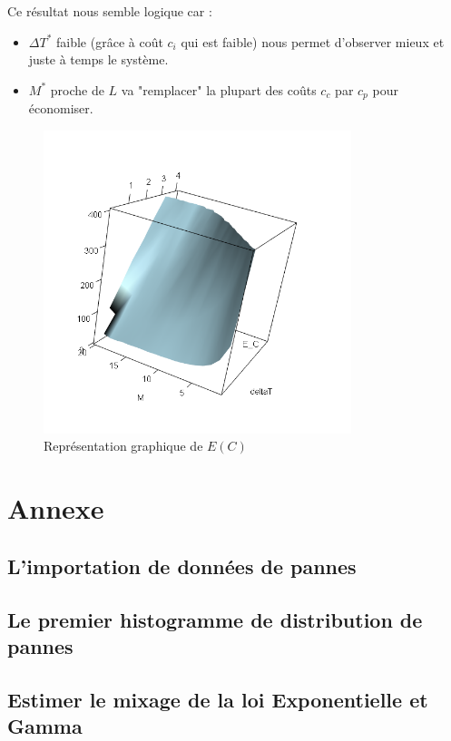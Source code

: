 \documentclass[10pt,a4paper]{article}
\begin{document}
Ce résultat nous semble logique car :
\begin{itemize}
    \item $\Delta T^*$ faible (grâce à  coût $c_i$ qui est faible) nous permet d'observer mieux et juste à temps le système.
    \item $M^*$ proche de $L$ va "remplacer" la plupart des coûts $c_c$ par $c_p$ pour économiser.
\end{itemize}

\begin{figure}
    \centering
    \caption{Représentation graphique de $E(C)$}
    \label{fig:e_c}
    \includegraphics[width=0.8\textwidth]{img/E_C_degrad.png}
\end{figure}

\clearpage
\section{Annexe}
\subsection{L'importation de données de pannes}
\label{annexe:import_pannes}

\subsection{Le premier histogramme de distribution de pannes}
\label{annexe:premier_histo}

\subsection{Estimer le mixage de la loi Exponentielle et Gamma}
\label{annexe:em_exp_gamma}

\end{document}
